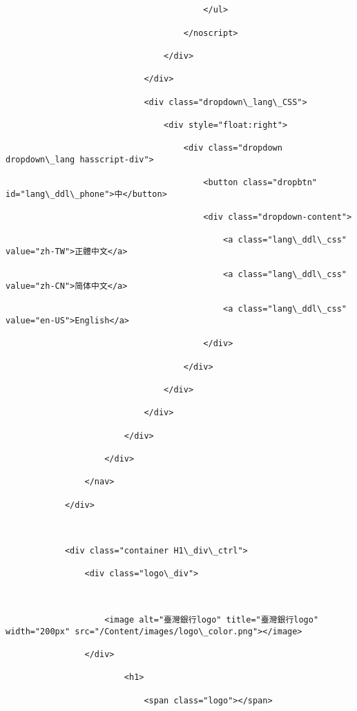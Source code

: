 \documentclass[11pt]{article}
\begin{document}
\begin{Verbatim}[commandchars=\\\{\}]
                                            

                                        </ul>

                                    </noscript>

                                </div>

                            </div>

                            <div class="dropdown\_lang\_CSS">

                                <div style="float:right">

                                    <div class="dropdown dropdown\_lang hasscript-div">

                                        <button class="dropbtn" id="lang\_ddl\_phone">中</button>

                                        <div class="dropdown-content">

                                            <a class="lang\_ddl\_css" value="zh-TW">正體中文</a>

                                            <a class="lang\_ddl\_css" value="zh-CN">简体中文</a>

                                            <a class="lang\_ddl\_css" value="en-US">English</a>

                                        </div>

                                    </div>

                                </div>

                            </div>

                        </div>

                    </div>

                </nav>

            </div>



            <div class="container H1\_div\_ctrl">

                <div class="logo\_div">

                    

                    <image alt="臺灣銀行logo" title="臺灣銀行logo" width="200px" src="/Content/images/logo\_color.png"></image>

                </div>

                        <h1>

                            <span class="logo"></span>


\end{Verbatim}
\end{document}
